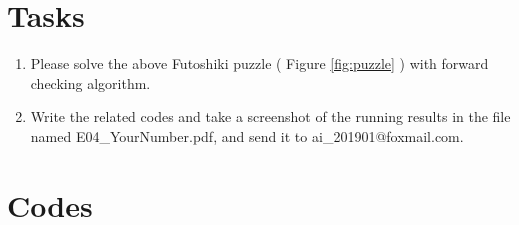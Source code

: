 ﻿\documentclass[a4paper, 11pt]{article}
\begin{document}
\section{Tasks}


\begin{enumerate}
\item Please solve the above Futoshiki puzzle ( Figure \ref{fig:puzzle} ) with forward checking algorithm.
\item Write the related codes and take a screenshot of the running results in the file named \textsf{E04\_YourNumber.pdf}, and send it to \textsf{ai\_201901@foxmail.com}.

\end{enumerate}
\section{Codes}
\end{document}
